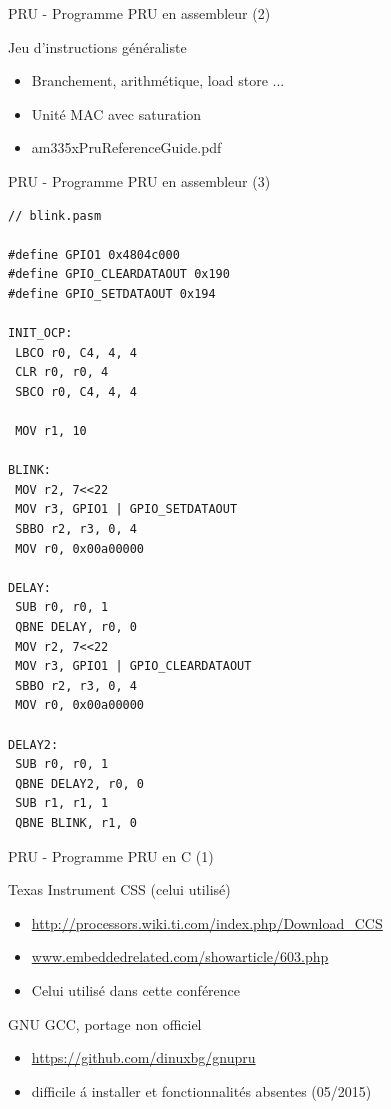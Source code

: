 \documentclass{beamer}
\begin{document}
\begin{frame}{PRU - Programme PRU en assembleur (2)}
  \begin{small}
    Jeu d'instructions g\'en\'eraliste
    \begin{itemize}
    \item Branchement, arithm\'etique, load store ...
    \item Unit\'e MAC avec saturation
    \item am335xPruReferenceGuide.pdf
    \end{itemize}
  \end{small}
\end{frame}


\begin{frame}[containsverbatim]{PRU - Programme PRU en assembleur (3)}
   \lstset{language=C++}
   \begin{lstlisting}[frame=tb]
// blink.pasm

#define GPIO1 0x4804c000
#define GPIO_CLEARDATAOUT 0x190
#define GPIO_SETDATAOUT 0x194

INIT_OCP:
 LBCO r0, C4, 4, 4
 CLR r0, r0, 4
 SBCO r0, C4, 4, 4

 MOV r1, 10

BLINK:
 MOV r2, 7<<22
 MOV r3, GPIO1 | GPIO_SETDATAOUT
 SBBO r2, r3, 0, 4
 MOV r0, 0x00a00000

DELAY:
 SUB r0, r0, 1
 QBNE DELAY, r0, 0
 MOV r2, 7<<22
 MOV r3, GPIO1 | GPIO_CLEARDATAOUT
 SBBO r2, r3, 0, 4
 MOV r0, 0x00a00000

DELAY2:
 SUB r0, r0, 1
 QBNE DELAY2, r0, 0
 SUB r1, r1, 1
 QBNE BLINK, r1, 0
 \end{lstlisting}
\end{frame}


\begin{frame}{PRU - Programme PRU en C (1)}
  \begin{tiny}

    Texas Instrument CSS (celui utilis\'e)
    \begin{itemize}
    \item \url{http://processors.wiki.ti.com/index.php/Download_CCS}
    \item \url{www.embeddedrelated.com/showarticle/603.php}
    \item Celui utilis\'e dans cette conf\'erence \newline
    \end{itemize}

    GNU GCC, portage non officiel
    \begin{itemize}
    \item \url{https://github.com/dinuxbg/gnupru}
    \item difficile \'a installer et fonctionnalit\'es absentes (05/2015)
    \end{itemize}

  \end{tiny}
\end{frame}
\end{document}
